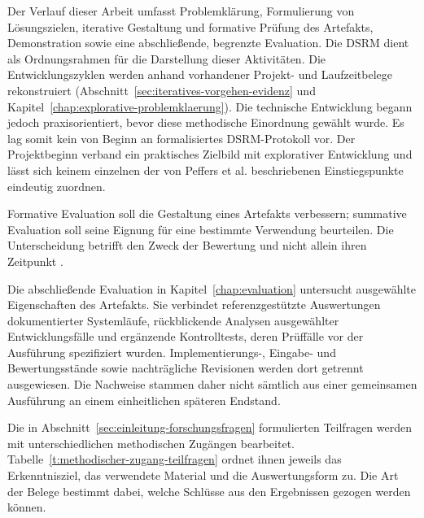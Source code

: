 Der Verlauf dieser Arbeit umfasst Problemklärung, Formulierung von
Lösungszielen, iterative Gestaltung und formative Prüfung des Artefakts,
Demonstration sowie eine abschließende, begrenzte Evaluation. Die DSRM
dient als Ordnungsrahmen für die Darstellung dieser Aktivitäten.
Die Entwicklungszyklen werden anhand vorhandener Projekt- und
Laufzeitbelege rekonstruiert
(Abschnitt~\ref{sec:iteratives-vorgehen-evidenz} und
Kapitel~\ref{chap:explorative-problemklaerung}). Die technische Entwicklung
begann jedoch praxisorientiert, bevor diese methodische Einordnung
gewählt wurde. Es lag somit kein von Beginn an formalisiertes
DSRM-Protokoll vor. Der Projektbeginn verband ein praktisches Zielbild
mit explorativer Entwicklung und lässt sich keinem einzelnen der von
Peffers et al. beschriebenen Einstiegspunkte eindeutig zuordnen.

Formative Evaluation soll die Gestaltung eines Artefakts verbessern;
summative Evaluation soll seine Eignung für eine bestimmte Verwendung
beurteilen. Die Unterscheidung betrifft den Zweck der Bewertung und
nicht allein ihren Zeitpunkt \cite[S.~78--79]{venable2016feds}.

Die abschließende Evaluation in Kapitel~\ref{chap:evaluation}
untersucht ausgewählte Eigenschaften des Artefakts. Sie verbindet
referenzgestützte
Auswertungen dokumentierter Systemläufe, rückblickende Analysen
ausgewählter Entwicklungsfälle und ergänzende Kontrolltests, deren
Prüffälle vor der Ausführung spezifiziert wurden. Implementierungs-,
Eingabe- und Bewertungsstände sowie nachträgliche Revisionen werden
dort getrennt ausgewiesen. Die Nachweise stammen daher nicht sämtlich
aus einer gemeinsamen Ausführung an einem einheitlichen späteren
Endstand.

Die in Abschnitt~\ref{sec:einleitung-forschungsfragen} formulierten
Teilfragen werden mit
unterschiedlichen methodischen Zugängen bearbeitet.
Tabelle~\ref{t:methodischer-zugang-teilfragen} ordnet ihnen jeweils das
Erkenntnisziel, das verwendete Material und die Auswertungsform zu.
Die Art der Belege bestimmt dabei, welche Schlüsse aus den Ergebnissen
gezogen werden können.

